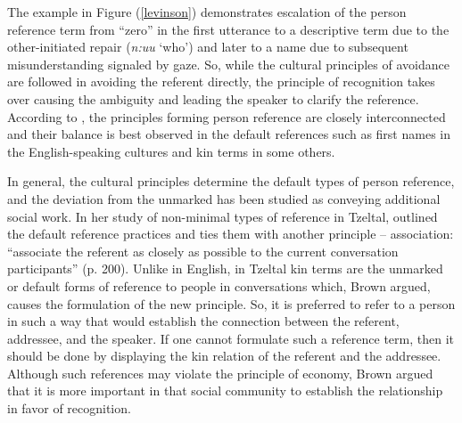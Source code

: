 \documentclass[12pt, draft]{article}
\begin{document}
The example in Figure (\ref{levinson}) demonstrates escalation of the person reference term from ``zero'' in the first utterance to a descriptive term due to the other-initiated repair (\textit{n:uu} `who') and later to a name due to subsequent misunderstanding signaled by gaze. So, while the cultural principles of avoidance are followed in avoiding the referent directly, the principle of recognition takes over causing the ambiguity and leading the speaker to clarify the reference. According to \textcite{levinson2007}, the principles forming person reference are closely interconnected and their balance is best observed in the default references such as first names in the English-speaking cultures and kin terms in some others.  

In general, the cultural principles determine the default types of person reference, and the deviation from the unmarked has been studied as conveying additional social work. In her study of non-minimal types of reference in Tzeltal, \textcite{brown2007} outlined the default reference practices and ties them with another principle – association: ``associate the referent as closely as possible to the current conversation participants'' (p. 200). Unlike in English, in Tzeltal kin terms are the unmarked or default forms of reference to people in conversations which, Brown argued, causes the formulation of the new principle. So, it is preferred to refer to a person in such a way that would establish the connection between the referent, addressee, and the speaker. If one cannot formulate such a reference term, then it should be done by displaying the kin relation of the referent and the addressee. Although such references may violate the principle of economy, Brown argued that it is more important in that social community to establish the relationship in favor of recognition. 
\end{document}
